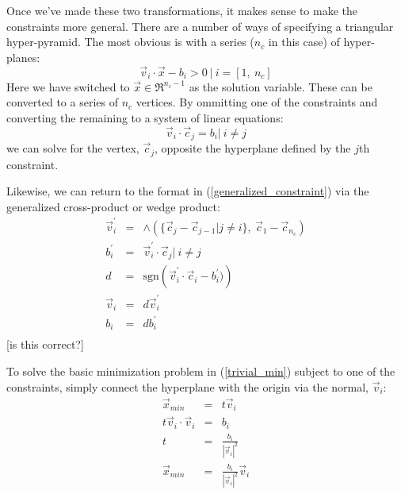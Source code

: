 \documentclass{article}
\begin{document}
Once we've made these two transformations, it makes sense to make the constraints
more general.  There are a number of ways of specifying a triangular
hyper-pyramid.  The most obvious is with a series ($n_c$ in this case) of hyper-
planes:
\begin{equation}
	\vec v_i \cdot \vec x - b_i > 0 ~ | ~ i=[1, ~n_c]
\label{generalized_constraint}
\end{equation}
Here we have switched to $\vec x \in \Re^{n_c-1}$ as the solution variable.  These can be 
converted to a series of $n_c$ vertices.  By ommitting one of the constraints
and converting the remaining to a system of linear equations:
\begin{equation}
\vec v_i \cdot \vec c_j = b_i | ~ i \ne j
\end{equation}
we can solve for the vertex, $\vec c_j$, opposite the hyperplane defined 
by the $j$th constraint.

Likewise, we can return to the format in (\ref{generalized_constraint}) via the
generalized cross-product or wedge product:
\begin{eqnarray}
	\vec v_i^\prime & = & \wedge \left ( \lbrace \vec c_j - \vec c_{j-1} | j \ne i \rbrace,~ \vec c_1-\vec c_{n_c} \right ) \\
	b_i^\prime &= & \vec v_i^\prime \cdot \vec c_j | ~ i \ne j \\
	d & = & \mathrm{sgn} \left (\vec v_i^\prime \cdot \vec c_i - b_i^\prime) \right ) \\
	\vec v_i & = & d \vec v_i^\prime \\
	b_i & = & d b_i^\prime \\
\end{eqnarray}
[is this correct?]

To solve the basic minimization problem in (\ref{trivial_min}) subject to
one of the constraints, simply connect the hyperplane with the origin via
the normal, $\vec v_i$:
\begin{eqnarray}
	\vec x_{min} & = & t \vec v_i \\
	t \vec v_i \cdot \vec v_i & = & b_i \\
	t & = & \frac{b_i}{|\vec v_i|^2} \\
	\vec x_{min} & = & \frac{b_i}{|\vec v_i |^2} \vec v_i \label{solution_1constraint}
\end{eqnarray}
\end{document}
